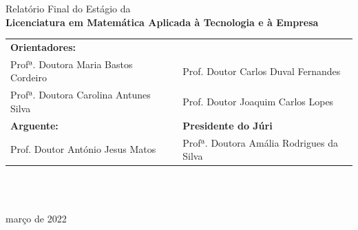 {  \large
Relatório Final do Estágio da \\
{\bf Licenciatura em Matemática Aplicada à Tecnologia e à Empresa}\\[1.0cm]
  {\normalsize
\begin{tabular}{l l l}
{\bf Orientadores:} & & \\[0.1cm]
  Profª. Doutora Maria Bastos Cordeiro   &    &Prof. Doutor Carlos Duval Fernandes\\
  Profª. Doutora Carolina  Antunes Silva &    &Prof. Doutor Joaquim Carlos Lopes\\[0.25cm]
 {\bf Arguente:} & & {\bf Presidente do Júri }\\[0.1cm]
  Prof. Doutor António Jesus Matos & & Profª. Doutora Amália Rodrigues
                                       da Silva
\end{tabular} \\[1.0cm]
}
\normalsize
\hrulefill\\
março de 2022

\par}
